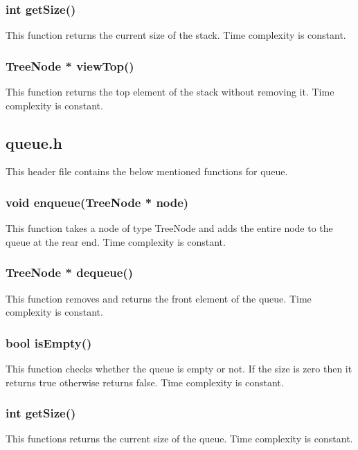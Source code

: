 \documentclass{article}
\begin{document}
\subsubsection{int getSize()}
This function returns the current size of the stack. Time complexity is constant.

\subsubsection{TreeNode * viewTop()}
This function returns the top element of the stack without removing it. Time complexity is constant.

\subsection{queue.h}
This header file contains the below mentioned functions for queue.

\subsubsection{void enqueue(TreeNode * node)}
This function takes a node of type TreeNode and adds the entire node to the queue at the rear end. Time complexity is constant.

\subsubsection{TreeNode * dequeue()}
This function removes and returns the front element of the queue. Time complexity is constant.

\subsubsection{bool isEmpty()}
This function checks whether the queue is empty or not. If the size is zero then it returns true otherwise returns false. Time complexity is constant.

\subsubsection{int getSize()}
This functions returns the current size of the queue. Time complexity is constant.
\end{document}
